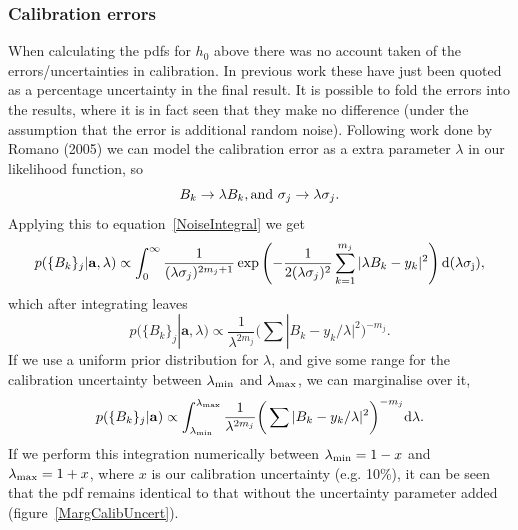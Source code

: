\subsubsection{Calibration errors}
When calculating the pdfs for $h_0$ above there was no account taken of the errors/uncertainties in
calibration. In previous work \cite{Abbott:2004, Abbott:2005} these have just been quoted as a
percentage uncertainty in the final result. It is possible to fold the errors into the results,
where it is in fact seen that they make no difference (under the assumption that the error is
additional random noise). Following work done by Romano (2005) \cite{Romano:2005} we can model the
calibration error as a extra parameter $\lambda$ in our likelihood function, so
\begin{equation}
B_k \to \lambda{}B_k, {\rm and~} \sigma_j \to \lambda\sigma_j.
\end{equation}
Applying this to equation~\ref{NoiseIntegral} we get
\begin{equation}
p(\{B_k\}_j|\mathbf{a}, \lambda) \propto \int_0^\infty
\frac{1}{(\lambda\sigma_j)^{2m_j+1}}\exp\left(-\frac{1}{2(\lambda\sigma_j)^2}\sum_{k=1}^{m_j}
|\lambda { } B_k - y_k|^2\right) \rm{d}(\lambda\sigma_j),
\end{equation}
which after integrating leaves
\begin{equation}
p(\{B_k\}_j|\mathbf{a},\lambda) \propto \frac{1}{\lambda^{2m_j}}\bigg(\sum|B_k -
y_k/\lambda|^2\bigg)^{-m_j}.
\end{equation}
If we use a uniform prior distribution for $\lambda$, and give some range for the calibration
uncertainty between $\lambda_{\rm min}$ and $\lambda_{\rm max}$, we can marginalise over it,
\begin{equation}\label{MargCalibUncertEqn}
p(\{B_k\}_j|\mathbf{a}) \propto \int_{\lambda_{\rm min}}^{\lambda_{\rm max}}
\frac{1}{\lambda^{2m_j}}\bigg(\sum|B_k - y_k/\lambda|^2\bigg)^{-m_j} \rm{d}\lambda.
\end{equation}
If we perform this integration numerically between $\lambda_{\rm min} = 1-x$ and $\lambda_{\rm max}
= 1+x$, where $x$ is our calibration uncertainty (e.g. 10\%), it can be seen that the pdf remains
identical to that without the uncertainty parameter added (figure~\ref{MargCalibUncert}).
